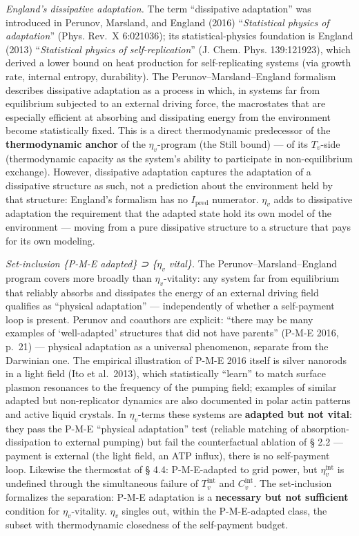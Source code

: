 \documentclass[pdflatex,sn-mathphys-ay]{sn-jnl}
\begin{document}
\emph{England's dissipative adaptation.} The term ``dissipative adaptation'' was introduced in Perunov, Marsland, and England (2016) ``\emph{Statistical physics of adaptation}'' (Phys. Rev.~X 6:021036); its statistical-physics foundation is England (2013) ``\emph{Statistical physics of self-replication}'' (J. Chem. Phys. 139:121923), which derived a lower bound on heat production for self-replicating systems (via growth rate, internal entropy, durability). The Perunov--Marsland--England formalism describes dissipative adaptation as a process in which, in systems far from equilibrium subjected to an external driving force, the macrostates that are especially efficient at absorbing and dissipating energy from the environment become statistically fixed. This is a direct thermodynamic predecessor of the \textbf{thermodynamic anchor} of the \(\eta_v\)-program (the Still bound) --- of its \(T_v\)-side (thermodynamic capacity as the system's ability to participate in non-equilibrium exchange). However, dissipative adaptation captures the adaptation of a dissipative structure as such, not a prediction about the environment held by that structure: England's formalism has no \(I_{\text{pred}}\) numerator. \(\eta_v\) adds to dissipative adaptation the requirement that the adapted state hold its own model of the environment --- moving from a pure dissipative structure to a structure that pays for its own modeling.

\emph{Set-inclusion \{P-M-E adapted\} ⊃ \{\(\eta_v\) vital\}.} The Perunov--Marsland--England program covers more broadly than \(\eta_v\)-vitality: any system far from equilibrium that reliably absorbs and dissipates the energy of an external driving field qualifies as ``physical adaptation'' --- independently of whether a self-payment loop is present. Perunov and coauthors are explicit: ``there may be many examples of `well-adapted' structures that did not have parents'' (P-M-E 2016, p.~21) --- physical adaptation as a universal phenomenon, separate from the Darwinian one. The empirical illustration of P-M-E 2016 itself is silver nanorods in a light field (Ito et al.~2013), which statistically ``learn'' to match surface plasmon resonances to the frequency of the pumping field; examples of similar adapted but non-replicator dynamics are also documented in polar actin patterns and active liquid crystals. In \(\eta_v\)-terms these systems are \textbf{adapted but not vital}: they pass the P-M-E ``physical adaptation'' test (reliable matching of absorption-dissipation to external pumping) but fail the counterfactual ablation of § 2.2 --- payment is external (the light field, an ATP influx), there is no self-payment loop. Likewise the thermostat of § 4.4: P-M-E-adapted to grid power, but \(\eta_v^{\text{int}}\) is undefined through the simultaneous failure of \(T_v^{\text{int}}\) and \(C_v^{\text{int}}\). The set-inclusion formalizes the separation: P-M-E adaptation is a \textbf{necessary but not sufficient} condition for \(\eta_v\)-vitality. \(\eta_v\) singles out, within the P-M-E-adapted class, the subset with thermodynamic closedness of the self-payment budget.
\end{document}
